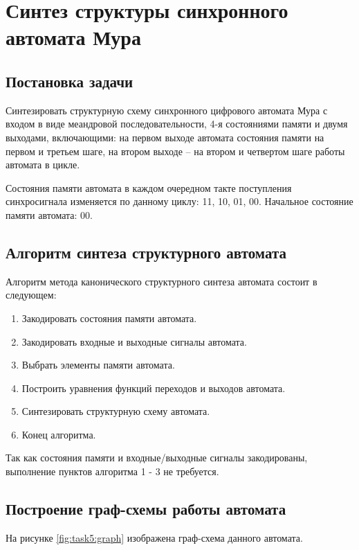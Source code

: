 \section{Синтез структуры синхронного автомата Мура}

\subsection{Постановка задачи}

Синтезировать структурную схему синхронного цифрового автомата Мура 
с входом в виде меандровой последовательности, 4-я состояниями памяти 
и двумя выходами, включающими: на первом выходе автомата состояния памяти на первом и третьем шаге, 
на втором выходе – на втором и четвертом шаге работы автомата в цикле.

Состояния памяти автомата в каждом очередном такте поступления синхросигнала изменяется по данному циклу: 11, 10, 01, 00. 
Начальное состояние памяти автомата: 00.

\subsection{Алгоритм синтеза структурного автомата}

Алгоритм метода канонического структурного синтеза автомата состоит в следующем:
%
\begin{enumerate}
    \item Закодировать состояния памяти автомата.
    \item Закодировать входные и выходные сигналы автомата.
    \item Выбрать элементы памяти автомата.
    \item Построить уравнения функций переходов и выходов автомата.
    \item Синтезировать структурную схему автомата.
    \item Конец алгоритма.
\end{enumerate}

\vspace{1em}

Так как состояния памяти и входные/выходные сигналы закодированы,
выполнение пунктов алгоритма 1 - 3 не требуется.

\subsection{Построение граф-схемы работы автомата}

На рисунке \ref{fig:task5:graph} изображена граф-схема данного автомата.

